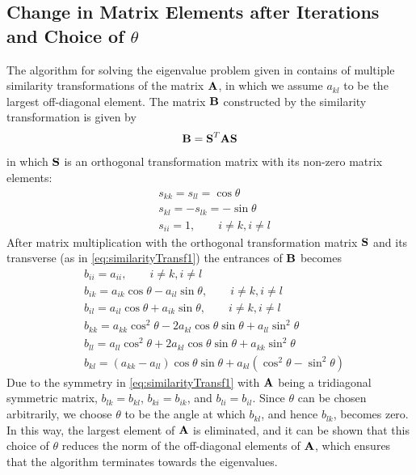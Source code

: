 \subsection{Change in Matrix Elements after Iterations and Choice of $\theta$}
\label{subsec:MatrixElementChange}
The algorithm for solving the eigenvalue problem given in  contains of multiple similarity transformations of the matrix $\mbox{\textbf{A}}$, in which we assume $a_{kl}$ to be the largest off-diagonal element.
The matrix $\mbox{\textbf{B}}$ constructed by the similarity transformation is given by
\begin{align}
	\mbox{\textbf{B}} = \mbox{\textbf{S}}^T \mbox{\textbf{A}} \mbox{\textbf{S}}
	\label{eq:similarityTransf1}
\end{align}
in which $\mbox{\textbf{S}}$ is an orthogonal transformation matrix with its non-zero matrix elements:
\begin{align*}
	& s_{kk} = s_{ll} = \cos \theta
	\\
	& s_{kl} = -s_{lk} = -\sin \theta 
	\\
	& s_{ii} = 1 , \qquad i \neq k , i \neq l
\end{align*}
After matrix multiplication with the orthogonal transformation matrix $\mbox{\textbf{S}}$ and its transverse (as in \eqref{eq:similarityTransf1}) the entrances of $\mbox{\textbf{B}}$ becomes
\begin{align*}
	& b_{ii} = a_{ii}, \qquad i \neq k, i \neq l
	\\
	& b_{ik} = a_{ik} \cos \theta - a_{il} \sin \theta , \qquad i \neq k , i \neq l
	\\
	& b_{il} = a_{il} \cos \theta + a_{ik} \sin \theta , \qquad i \neq k , i \neq l
	\\
	& b_{kk} = a_{kk} \cos ^2 \theta - 2 a_{kl} \cos \theta \sin \theta + a_{ll} \sin ^2 \theta
	\\
	 &b_{ll} = a_{ll} \cos ^2 \theta + 2 a_{kl} \cos \theta \sin \theta + a_{kk} \sin ^2 \theta
	\\
	& b_{kl} = (a_{kk} - a_{ll} ) \cos \theta \sin \theta + a_{kl} (\cos ^2 \theta - \sin ^2 \theta )
\end{align*}
Due to the symmetry in \eqref{eq:similarityTransf1} with $\mbox{\textbf{A}}$ being a tridiagonal symmetric matrix, $b_{lk} = b_{kl}$, $b_{ki} = b_{ik}$, and $b_{li} = b_{il}$.
Since $\theta$ can be chosen arbitrarily, we choose $\theta$ to be the angle at which $b_{kl}$, and hence $b_{lk}$, becomes zero.
In this way, the largest element of $\mbox{\textbf{A}}$ is eliminated, and it can be shown that this choice of $\theta$ reduces the norm of the off-diagonal elements of $\mbox{\textbf{A}}$, which ensures that the algorithm terminates towards the eigenvalues.


